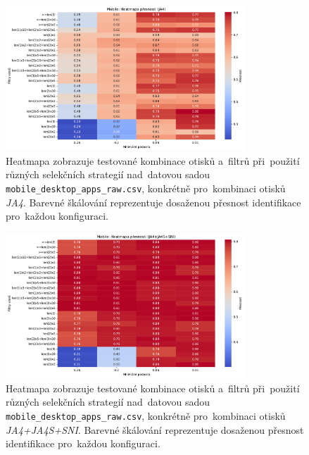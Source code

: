 \begin{figure}[H]
    \centering
    \includegraphics[angle=-90, width=0.8\textwidth]{obrazky-figures/exps/ex3-mobile-heatmap-JA4.pdf}
    \caption{Heatmapa zobrazuje testované kombinace otisků a~filtrů při~použití různých selekčních strategií nad~datovou sadou \texttt{mobile\_desktop\_apps\_raw.csv}, konkrétně pro~kombinaci otisků \textit{JA4}. Barevné škálování reprezentuje dosaženou přesnost identifikace pro~každou konfiguraci.}
    \label{fig:appendix-heatmap-iscx-filter-ja4}
\end{figure}

\begin{figure}[H]
    \centering
    \includegraphics[angle=-90, width=0.8\textwidth]{obrazky-figures/exps/ex3-mobile-heatmap-JA4+JA4S+SNI.pdf}
    \caption{Heatmapa zobrazuje testované kombinace otisků a~filtrů při~použití různých selekčních strategií nad~datovou sadou \texttt{mobile\_desktop\_apps\_raw.csv}, konkrétně pro~kombinaci otisků \textit{JA4+JA4S+SNI}. Barevné škálování reprezentuje dosaženou přesnost identifikace pro~každou konfiguraci.}
    \label{fig:appendix-heatmap-iscx-filter-ja4}
\end{figure}
